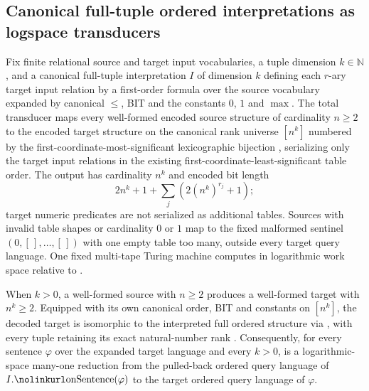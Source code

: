 \begin{result}
\subsection{Canonical full-tuple ordered interpretations as logspace transducers}
Fix finite relational source and target input vocabularies, a tuple dimension
$k\in\mathbb N$, and a canonical full-tuple interpretation $I$ of dimension $k$
defining each $r$-ary target input relation by a first-order formula over the
source vocabulary expanded by canonical $\le$, BIT and the constants $0$, $1$
and $\max$. The total transducer  maps every well-formed
encoded source structure of cardinality $n\ge2$ to the encoded target structure
on the canonical rank universe $[n^k]$ numbered by the
first-coordinate-most-significant lexicographic bijection ,
serializing only the target input relations in the existing
first-coordinate-least-significant  table order. The output
has cardinality $n^k$ and encoded bit length
\[
  2n^k+1+\sum_{j}(2(n^k)^{r_j}+1);
\]
target numeric predicates are not serialized as additional tables. Sources with
invalid table shapes or cardinality $0$ or $1$ map to the fixed malformed
sentinel $(0,[\,],\dots,[\,])$ with one empty table too many, outside every
target query language. One fixed multi-tape Turing machine computes
 in logarithmic work space relative to .

When $k>0$, a well-formed source with $n\ge2$ produces a well-formed target
with $n^k\ge2$. Equipped with its own canonical order, BIT and constants on
$[n^k]$, the decoded target is isomorphic to the interpreted full ordered
structure via , with every tuple retaining its exact
natural-number rank . Consequently, for every sentence $\varphi$
over the expanded target language and every $k>0$,  is a
logarithmic-space many-one reduction from the pulled-back ordered query
language of $I.\text{\lean{onSentence}}(\varphi)$ to the target ordered query
language of $\varphi$.


\end{result}
